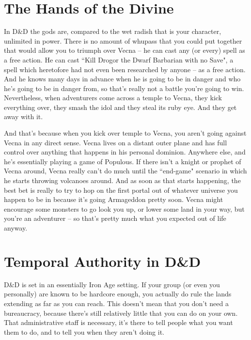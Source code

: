 \section{The Hands of the Divine}

In D\&D the gods are, compared to the wet radish that is your character, unlimited in power. There is no amount of whupass that you could put together that would allow you to triumph over Vecna -- he can cast any (or every) spell as a free action. He can cast ``Kill Drogor the Dwarf Barbarian with no Save", a spell which heretofore had not even been researched by anyone -- as a free action. And he knows many days in advance when he is going to be in danger and who he's going to be in danger from, so that's really not a battle you're going to win. Nevertheless, when adventurers come across a temple to Vecna, they kick everything over, they smash the idol and they steal its ruby eye. And they get away with it.

And that's because when you kick over temple to Vecna, you aren't going against Vecna in any direct sense. Vecna lives on a distant outer plane and has full control over anything that happens in his personal dominion. Anywhere else, and he's essentially playing a game of Populous. If there isn't a knight or prophet of Vecna around, Vecna really can't do much until the ``end-game" scenario in which he starts throwing volcanoes around. And as soon as that starts happening, the best bet is really to try to hop on the first portal out of whatever universe you happen to be in because it's going Armageddon pretty soon. Vecna might encourage some monsters to go look you up, or lower some land in your way, but you're an adventurer -- so that's pretty much what you expected out of life anyway.

\section{Temporal Authority in D\&D}
\vspace*{-8pt}

D\&D is set in an essentially Iron Age setting. If your group (or even you personally) are known to be hardcore enough, you actually do rule the lands extending as far as you can reach. This doesn't mean that you don't need a bureaucracy, because there's still relatively little that you can do on your own. That administrative staff is necessary, it's there to tell people what you want them to do, and to tell you when they aren't doing it.

